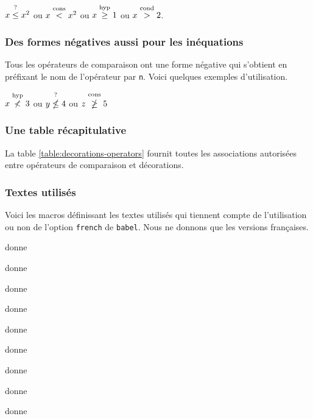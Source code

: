 \documentclass[12pt,a4paper]{article}
\begin{document}
\begin{latexex}
$x \leqtest x^2$ ou $x \lesscons x^2$ ou
$x \geqhyp 1$    ou $x \gtrcond 2$.
\end{latexex}




\subsubsection{Des formes négatives aussi pour les inéquations}

Tous les opérateurs de comparaison ont une forme négative qui s'obtient en préfixant le nom de l'opérateur par \verb+n+.
Voici quelques exemples d'utilisation.

\begin{latexex}
$x \nlesshyp 3$ ou
$y \nleqtest 4$ ou
$z \ngeqcons 5$
\end{latexex}




\subsubsection{Une table récapitulative}

La table \ref{table:decorations-operators}  fournit toutes les associations autorisées entre opérateurs de comparaison et décorations.




\subsubsection{Textes utilisés} \label{text-for-opes}

Voici les macros définissant les textes utilisés qui tiennent compte de l'utilisation ou non de l'option \verb+french+ de \verb+babel+. Nous ne donnons que les versions françaises.

\vspace{-.5em}


\begin{multicols}{2}
     donne \emph{\og \textopappli \fg}

     donne \emph{\og \textopchoice \fg}

     donne \emph{\og \textopcond \fg}

     donne \emph{\og \textopcons \fg}

     donne \emph{\og \textopdef \fg}

     donne \emph{\og \textophyp \fg}

     donne \emph{\og \textopid \fg}

     donne \emph{\og \textopplot \fg}

     donne \emph{\og \textoptest \fg}
\vfill\null\end{multicols}
\end{document}
